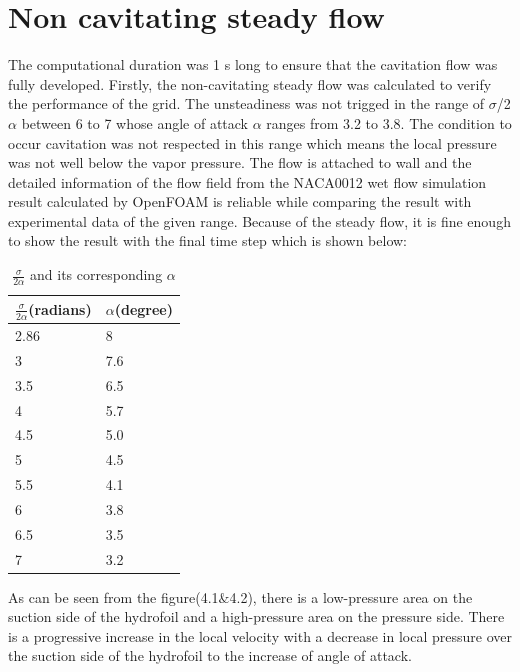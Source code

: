 \section{Non cavitating steady flow}
The computational duration was 1 s long to ensure that the cavitation flow was fully developed. Firstly, 
the non-cavitating steady flow was calculated to verify the performance of the grid. The unsteadiness was not trigged in the range of $\sigma$/{2$\alpha$}  
between 6 to 7 whose angle of attack $\alpha$ ranges from 3.2 to 3.8. The condition to occur cavitation was not respected 
in this range which means the local pressure was not well below the vapor pressure. The flow is attached to wall  and the detailed 
information of the flow field from the NACA0012 wet flow simulation result calculated by OpenFOAM is reliable while comparing the result 
with experimental data of the given range. Because of the steady flow, it is fine enough to show the result with the final 
time step which is shown below:\\
\begin{table}[h]
\centering
\begin{tabular}{|l|l|}
\hline
\rowcolor{gray!20} $\frac{\sigma}{2\alpha}$(radians)&$\alpha$(degree) \\ \hline
 2.86&8  \\ \hline
 3& 7.6 \\ \hline
 3.5&6.5  \\ \hline
 4& 5.7 \\ \hline
4.5 &5.0  \\ \hline
5 & 4.5 \\ \hline
 5.5&4.1  \\ \hline
 6& 3.8 \\ \hline
6.5 & 3.5 \\ \hline
 7& 3.2 \\ \hline
\end{tabular}
\caption{$\frac{\sigma}{2\alpha}$ and its corresponding $\alpha$}
\label{}
\end{table}
As can be seen from the figure(4.1$\&$4.2), there is a low-pressure area on the suction side of the hydrofoil 
and a high-pressure area on the pressure side. There is a progressive increase in the local velocity 
with a decrease in local pressure over the suction side of the hydrofoil to the 
increase of angle of attack. 

